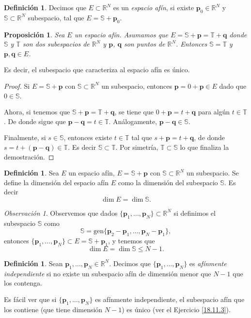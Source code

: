 \documentclass[12pt, a4paper]{amsbook}
\newcommand{\R}{{\mathbb R}}
\newcommand{\Sb}{{\mathbb S}}
\newcommand{\Tb}{{\mathbb T}}
\newcommand{\pp}{{\mathbf p}}
\newcommand{\qq}{{\mathbf q}}
\newtheorem{prop}[teo]{Proposici\'on}
\theoremstyle{remark}
\newtheorem{obs}[teo]{Observaci\'on}
\theoremstyle{definition}
\newtheorem{defi}[teo]{Definici\'on}
\numberwithin{section}{chapter}
\numberwithin{subsection}{section}
\numberwithin{equation}{section}
\numberwithin{figure}{chapter}
\begin{document}
\begin{defi}
Decimos que $E\subset \R^N$ es un {\em espacio afín}, si existe $\pp_0\in \R^N$ y $\Sb\subset \R^N$ subespacio, tal que $E=\Sb + \pp_0$. 
\end{defi}

\begin{prop}
Sea $E$ un espacio afín. Asumamos que $E =\Sb + \pp = \Tb + \qq$ donde $\Sb$ y $\Tb$ son dos subespacios de $\R^N$ y $\pp$, $\qq$ son puntos de $\R^N$. Entonces $\Sb = \Tb$ y $\pp, \qq\in E$.
\end{prop}

Es decir, el subespacio que caracteriza al espacio afín es único.

\begin{proof}
Si $E = \Sb + \pp$ con $\Sb\subset \R^N$ un subespacio, entonces $\pp = 0+\pp\in E$ dado que $0\in\Sb$.

Ahora, si tenemos que $\Sb + \pp = \Tb + \qq$, se tiene que $0+\pp = t + \qq$ para algún $t\in\Tb$. De donde sigue que $\pp-\qq = t\in \Tb$. Análogamente, $\pp-\qq\in \Sb$. 

Finalmente, si $s\in \Sb$, entonces existe $t \in \Tb$ tal que $s+\pp = t+\qq$, de donde $s = t + (\pp-\qq)\in \Tb$. Es decir $\Sb\subset \Tb$. Por simetría, $\Tb\subset \Sb$ lo que finaliza la demostración.
\end{proof}

\begin{defi}
Sea $E$ un espacio afín, $E=\Sb + \pp$ con $\Sb\subset \R^N$ un subespacio. Se define la dimensión del espacio afín $E$ como la dimensión del subespacio $\Sb$. Es decir
$$
\dim E = \dim \Sb.
$$
\end{defi}

\begin{obs}\label{obs.unico}
Observemos que dados $\{\pp_1,\dots,\pp_N\}\subset \R^N$ si definimos el subespacio $\Sb$ como
$$
\Sb = \text{gen}\{\pp_2-\pp_1,\dots,\pp_N-\pp_1\},
$$
entonces $\{\pp_1,\dots,\pp_N\}\subset E = \Sb + \pp_1$, y tenemos que
$$
\dim E = \dim \Sb\le N-1.
$$
\end{obs}

\begin{defi}
Sean $\pp_1,\dots,\pp_N\in \R^N$. Decimos que $\{\pp_1,\dots,\pp_N\}$ es {\em afínmente independiente} si no existe un subespacio afín de dimensión menor que $N-1$ que los contenga.
\end{defi}

Es fácil ver que si $\{\pp_1,\dots,\pp_N\}$ es afínmente independiente, el subespacio afín que los contiene (que tiene dimensión $N-1$) es único (ver el Ejercicio \ref{18.11.3}).
\end{document}

